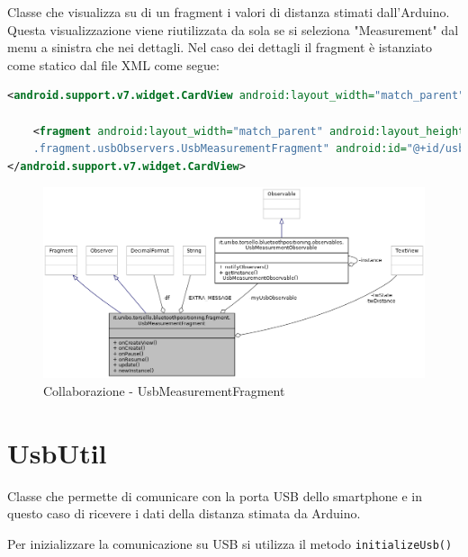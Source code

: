 Classe che visualizza su di un fragment i valori di distanza stimati dall'Arduino. Questa visualizzazione viene riutilizzata da sola se si seleziona "Measurement" dal menu a sinistra che nei dettagli. Nel caso dei dettagli il fragment è istanziato come statico dal file XML come segue:

\begin{lstlisting}[language=XML]
<android.support.v7.widget.CardView android:layout_width="match_parent"	android:layout_height="wrap_content" android:layout_margin="@dimen/card_margin">

	<fragment android:layout_width="match_parent" android:layout_height="wrap_content" android:name="it.unibo.torsello.bluetoothpositioning
	.fragment.usbObservers.UsbMeasurementFragment" android:id="@+id/usbArduino" tools:layout="@layout/fragment_usb_measurement" />
</android.support.v7.widget.CardView>
\end{lstlisting}

\begin{figure}[ph]
	\centering
	\includegraphics[width=1.6\linewidth,angle=90]{img/uml/class/classit_1_1unibo_1_1torsello_1_1bluetoothpositioning_1_1fragment_1_1UsbMeasurementFragment__coll__graph.png}
	\caption{Collaborazione - UsbMeasurementFragment}
\end{figure}

\newpage
\section{UsbUtil}

Classe che permette di comunicare con la porta USB dello smartphone e in questo caso di ricevere i dati della distanza stimata da Arduino. 

Per inizializzare la comunicazione su USB si utilizza il metodo \texttt{initializeUsb()}
